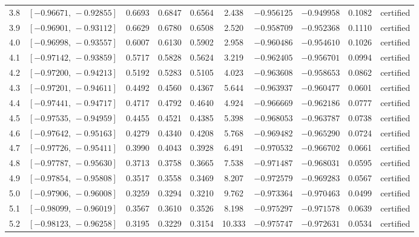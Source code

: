 {\begin{longtable}{@{}lccccccccl@{}}
\rule[-3pt]{0pt}{11.5pt} 3.8 & $[-0.96671,\,-0.92855]$ & 0.6693 & 0.6847 & 0.6564 & 2.438 & $-0.956125$ & $-0.949958$ & 0.1082 & certified \\
\rule[-3pt]{0pt}{11.5pt} 3.9 & $[-0.96901,\,-0.93112]$ & 0.6629 & 0.6780 & 0.6508 & 2.520 & $-0.958709$ & $-0.952368$ & 0.1110 & certified \\
\rule[-3pt]{0pt}{11.5pt} 4.0 & $[-0.96998,\,-0.93557]$ & 0.6007 & 0.6130 & 0.5902 & 2.958 & $-0.960486$ & $-0.954610$ & 0.1026 & certified \\
\rule[-3pt]{0pt}{11.5pt} 4.1 & $[-0.97142,\,-0.93859]$ & 0.5717 & 0.5828 & 0.5624 & 3.219 & $-0.962405$ & $-0.956701$ & 0.0994 & certified \\
\rule[-3pt]{0pt}{11.5pt} 4.2 & $[-0.97200,\,-0.94213]$ & 0.5192 & 0.5283 & 0.5105 & 4.023 & $-0.963608$ & $-0.958653$ & 0.0862 & certified \\
\rule[-3pt]{0pt}{11.5pt} 4.3 & $[-0.97201,\,-0.94611]$ & 0.4492 & 0.4560 & 0.4367 & 5.644 & $-0.963937$ & $-0.960477$ & 0.0601 & certified \\
\rule[-3pt]{0pt}{11.5pt} 4.4 & $[-0.97441,\,-0.94717]$ & 0.4717 & 0.4792 & 0.4640 & 4.924 & $-0.966669$ & $-0.962186$ & 0.0777 & certified \\
\rule[-3pt]{0pt}{11.5pt} 4.5 & $[-0.97535,\,-0.94959]$ & 0.4455 & 0.4521 & 0.4385 & 5.398 & $-0.968053$ & $-0.963787$ & 0.0738 & certified \\
\rule[-3pt]{0pt}{11.5pt} 4.6 & $[-0.97642,\,-0.95163]$ & 0.4279 & 0.4340 & 0.4208 & 5.768 & $-0.969482$ & $-0.965290$ & 0.0724 & certified \\
\rule[-3pt]{0pt}{11.5pt} 4.7 & $[-0.97726,\,-0.95411]$ & 0.3990 & 0.4043 & 0.3928 & 6.491 & $-0.970532$ & $-0.966702$ & 0.0661 & certified \\
\rule[-3pt]{0pt}{11.5pt} 4.8 & $[-0.97787,\,-0.95630]$ & 0.3713 & 0.3758 & 0.3665 & 7.538 & $-0.971487$ & $-0.968031$ & 0.0595 & certified \\
\rule[-3pt]{0pt}{11.5pt} 4.9 & $[-0.97854,\,-0.95808]$ & 0.3517 & 0.3558 & 0.3469 & 8.207 & $-0.972579$ & $-0.969283$ & 0.0567 & certified \\
\rule[-3pt]{0pt}{11.5pt} 5.0 & $[-0.97906,\,-0.96008]$ & 0.3259 & 0.3294 & 0.3210 & 9.762 & $-0.973364$ & $-0.970463$ & 0.0499 & certified \\
\rule[-3pt]{0pt}{11.5pt} 5.1 & $[-0.98099,\,-0.96019]$ & 0.3567 & 0.3610 & 0.3526 & 8.198 & $-0.975297$ & $-0.971578$ & 0.0639 & certified \\
\rule[-3pt]{0pt}{11.5pt} 5.2 & $[-0.98123,\,-0.96258]$ & 0.3195 & 0.3229 & 0.3154 & 10.333 & $-0.975747$ & $-0.972631$ & 0.0534 & certified \\

\end{longtable}}
